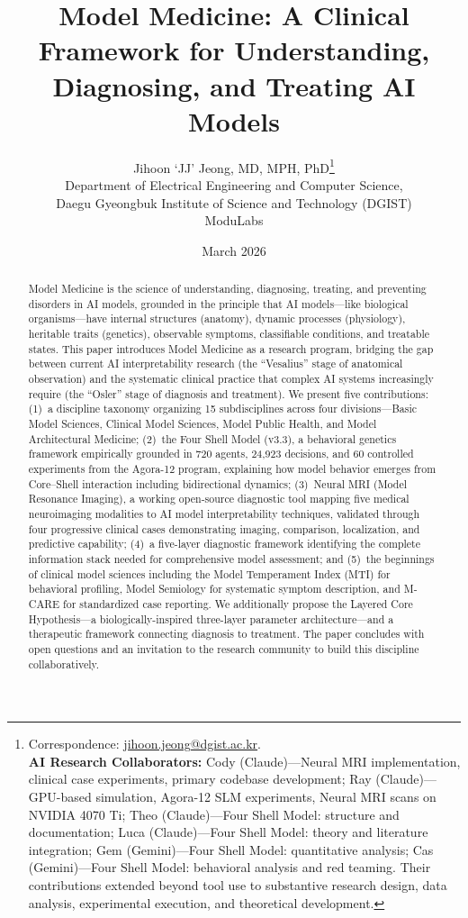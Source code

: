 \documentclass[11pt]{article}
\title{\textbf{Model Medicine: A Clinical Framework for Understanding, Diagnosing, and Treating AI Models}}
\author{
  Jihoon `JJ' Jeong, MD, MPH, PhD\thanks{Correspondence: \href{mailto:jihoon.jeong@dgist.ac.kr}{jihoon.jeong@dgist.ac.kr}. \\ \textbf{AI Research Collaborators:} Cody (Claude)---Neural MRI implementation, clinical case experiments, primary codebase development; Ray (Claude)---GPU-based simulation, Agora-12 SLM experiments, Neural MRI scans on NVIDIA 4070 Ti; Theo (Claude)---Four Shell Model: structure and documentation; Luca (Claude)---Four Shell Model: theory and literature integration; Gem (Gemini)---Four Shell Model: quantitative analysis; Cas (Gemini)---Four Shell Model: behavioral analysis and red teaming. Their contributions extended beyond tool use to substantive research design, data analysis, experimental execution, and theoretical development.}\\[4pt]
  Department of Electrical Engineering and Computer Science,\\
  Daegu Gyeongbuk Institute of Science and Technology (DGIST)\\
  ModuLabs
}
\date{March 2026}
\begin{document}
\maketitle

\begin{abstract}
Model Medicine is the science of understanding, diagnosing, treating, and preventing disorders in AI models, grounded in the principle that AI models---like biological organisms---have internal structures (anatomy), dynamic processes (physiology), heritable traits (genetics), observable symptoms, classifiable conditions, and treatable states. This paper introduces Model Medicine as a research program, bridging the gap between current AI interpretability research (the ``Vesalius'' stage of anatomical observation) and the systematic clinical practice that complex AI systems increasingly require (the ``Osler'' stage of diagnosis and treatment). We present five contributions: (1)~a discipline taxonomy organizing 15 subdisciplines across four divisions---Basic Model Sciences, Clinical Model Sciences, Model Public Health, and Model Architectural Medicine; (2)~the Four Shell Model (v3.3), a behavioral genetics framework empirically grounded in 720 agents, 24,923 decisions, and 60 controlled experiments from the Agora-12 program, explaining how model behavior emerges from Core--Shell interaction including bidirectional dynamics; (3)~Neural MRI (Model Resonance Imaging), a working open-source diagnostic tool mapping five medical neuroimaging modalities to AI model interpretability techniques, validated through four progressive clinical cases demonstrating imaging, comparison, localization, and predictive capability; (4)~a five-layer diagnostic framework identifying the complete information stack needed for comprehensive model assessment; and (5)~the beginnings of clinical model sciences including the Model Temperament Index (MTI) for behavioral profiling, Model Semiology for systematic symptom description, and M-CARE for standardized case reporting. We additionally propose the Layered Core Hypothesis---a biologically-inspired three-layer parameter architecture---and a therapeutic framework connecting diagnosis to treatment. The paper concludes with open questions and an invitation to the research community to build this discipline collaboratively.
\end{abstract}

\end{document}

